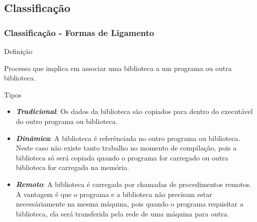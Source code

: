  \subsection{Classificação}
\begin{frame}
 \frametitle{Classificação - Formas de Ligamento}

 \begin{block}{Definição}

  Processo que implica em associar uma biblioteca a um programa ou outra biblioteca.

 \end{block}

 \begin{block}{Tipos}

  \begin{itemize}

   \item \emph{\textbf{Tradicional}}: Os dados da biblioteca são copiados para dentro do executável do outro programa
   ou biblioteca.

   \item \emph{\textbf{Dinâmica}}: A biblioteca é referênciada no outro programa ou biblioteca. Neste caso não existe
   tanto trabalho no momento de compilação, pois a biblioteca só será copiada quando o programa for carregado ou outra
   biblioteca for carregada na memória.

   \item \emph{\textbf{Remoto}}: A biblioteca é carregada por chamadas de procedimentos remotos. A vantagem é que o
   programa e a biblioteca não precisam estar necessáriamente na mesma máquina, pois quando o programa requisitar
   a biblioteca, ela será transferida pela rede de uma máquina para outra.

  \end{itemize}

 \end{block}

\end{frame}


